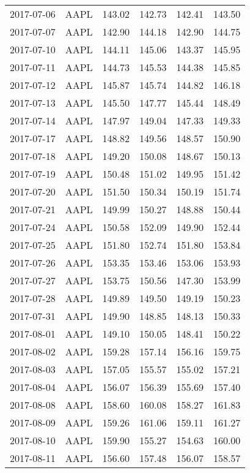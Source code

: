 \documentclass[a4paper, 12pt]{report}
\begin{document}
\begin{appendices}
\begin{longtable}{llllll}
  2017-07-06 & AAPL & 143.02 & 142.73 & 142.41 & 143.50 \\ 
  2017-07-07 & AAPL & 142.90 & 144.18 & 142.90 & 144.75 \\ 
  2017-07-10 & AAPL & 144.11 & 145.06 & 143.37 & 145.95 \\ 
  2017-07-11 & AAPL & 144.73 & 145.53 & 144.38 & 145.85 \\ 
  2017-07-12 & AAPL & 145.87 & 145.74 & 144.82 & 146.18 \\ 
  2017-07-13 & AAPL & 145.50 & 147.77 & 145.44 & 148.49 \\ 
  2017-07-14 & AAPL & 147.97 & 149.04 & 147.33 & 149.33 \\ 
  2017-07-17 & AAPL & 148.82 & 149.56 & 148.57 & 150.90 \\ 
  2017-07-18 & AAPL & 149.20 & 150.08 & 148.67 & 150.13 \\ 
  2017-07-19 & AAPL & 150.48 & 151.02 & 149.95 & 151.42 \\ 
  2017-07-20 & AAPL & 151.50 & 150.34 & 150.19 & 151.74 \\ 
  2017-07-21 & AAPL & 149.99 & 150.27 & 148.88 & 150.44 \\ 
  2017-07-24 & AAPL & 150.58 & 152.09 & 149.90 & 152.44 \\ 
  2017-07-25 & AAPL & 151.80 & 152.74 & 151.80 & 153.84 \\ 
  2017-07-26 & AAPL & 153.35 & 153.46 & 153.06 & 153.93 \\ 
  2017-07-27 & AAPL & 153.75 & 150.56 & 147.30 & 153.99 \\ 
  2017-07-28 & AAPL & 149.89 & 149.50 & 149.19 & 150.23 \\ 
  2017-07-31 & AAPL & 149.90 & 148.85 & 148.13 & 150.33 \\ 
  2017-08-01 & AAPL & 149.10 & 150.05 & 148.41 & 150.22 \\ 
  2017-08-02 & AAPL & 159.28 & 157.14 & 156.16 & 159.75 \\ 
  2017-08-03 & AAPL & 157.05 & 155.57 & 155.02 & 157.21 \\ 
  2017-08-04 & AAPL & 156.07 & 156.39 & 155.69 & 157.40 \\ 
  2017-08-08 & AAPL & 158.60 & 160.08 & 158.27 & 161.83 \\ 
  2017-08-09 & AAPL & 159.26 & 161.06 & 159.11 & 161.27 \\ 
  2017-08-10 & AAPL & 159.90 & 155.27 & 154.63 & 160.00 \\ 
  2017-08-11 & AAPL & 156.60 & 157.48 & 156.07 & 158.57 \\ 

\end{longtable}
\end{appendices}
\end{document}
